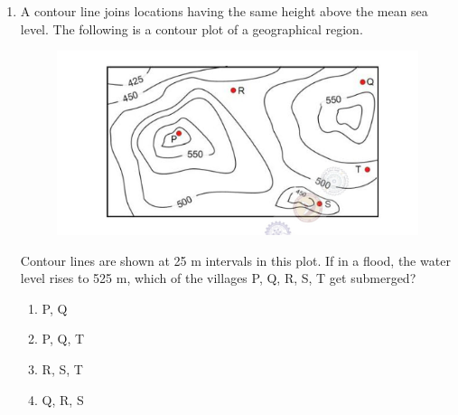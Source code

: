 \documentclass[journal,12pt,onecolumn]{IEEEtran}
\theoremstyle{remark}
\begin{document}
\begin{enumerate}
\item A contour line joins locations having the same height above the mean sea level.  
The following is a contour plot of a geographical region.  
\begin{figure}[H]
    \centering
    \includegraphics[width=0.5\columnwidth]{figs/65.png}
    \caption{}
    \label{fig:placeholder}
\end{figure}
Contour lines are shown at 25 m intervals in this plot.  
If in a flood, the water level rises to 525 m, which of the villages P, Q, R, S, T get submerged?
\begin{multicols}{2}
\begin{enumerate}
\item P, Q  
\item P, Q, T  
\item R, S, T  
\item Q, R, S  
\end{enumerate}
\end{multicols}

\end{enumerate}
\end{document}
